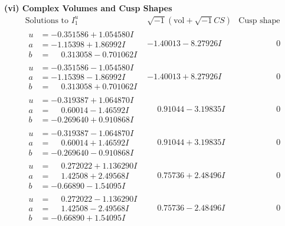 \documentclass[1p]{elsarticle_modified}
\theoremstyle{definition}
\newcommand{\I}{\sqrt{-1}}
\begin{document}
\newpage\flushleft \textbf{(vi) Complex Volumes and Cusp Shapes}
$$\begin{array}{c|c|c}  
\text{Solutions to }I^u_{1}& \I (\text{vol} + \sqrt{-1}CS) & \text{Cusp shape}\\
 \hline 
\begin{aligned}
u &= -0.351586 + 1.054580 I \\
a &= -1.15398 + 1.86992 I \\
b &= \phantom{-}0.313058 - 0.701062 I\end{aligned}
 & -1.40013 - 8.27926 I & \phantom{-0.000000 } 0 \\ \hline\begin{aligned}
u &= -0.351586 - 1.054580 I \\
a &= -1.15398 - 1.86992 I \\
b &= \phantom{-}0.313058 + 0.701062 I\end{aligned}
 & -1.40013 + 8.27926 I & \phantom{-0.000000 } 0 \\ \hline\begin{aligned}
u &= -0.319387 + 1.064870 I \\
a &= \phantom{-}0.60014 - 1.46592 I \\
b &= -0.269640 + 0.910868 I\end{aligned}
 & \phantom{-}0.91044 - 3.19835 I & \phantom{-0.000000 } 0 \\ \hline\begin{aligned}
u &= -0.319387 - 1.064870 I \\
a &= \phantom{-}0.60014 + 1.46592 I \\
b &= -0.269640 - 0.910868 I\end{aligned}
 & \phantom{-}0.91044 + 3.19835 I & \phantom{-0.000000 } 0 \\ \hline\begin{aligned}
u &= \phantom{-}0.272022 + 1.136290 I \\
a &= \phantom{-}1.42508 + 2.49568 I \\
b &= -0.66890 - 1.54095 I\end{aligned}
 & \phantom{-}0.75736 + 2.48496 I & \phantom{-0.000000 } 0 \\ \hline\begin{aligned}
u &= \phantom{-}0.272022 - 1.136290 I \\
a &= \phantom{-}1.42508 - 2.49568 I \\
b &= -0.66890 + 1.54095 I\end{aligned}
 & \phantom{-}0.75736 - 2.48496 I & \phantom{-0.000000 } 0 \\ \hline\begin{aligned}

\end{aligned}
\end{array}$$
\end{document}
